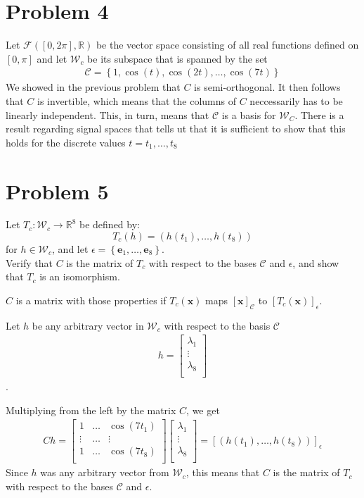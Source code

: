 \documentclass[paper=a4, fontsize=11pt]{scrartcl} %
\numberwithin{equation}{section} %
\numberwithin{figure}{section} %
\numberwithin{table}{section} %
\theoremstyle{definition}
\begin{document}
\section*{Problem 4}
Let $\mathcal{F}([0, 2\pi], \mathbb{R})$ be the vector space consisting of all real functions defined on $\left[ 0, \pi \right]$ and let
$\mathcal{W}_c$ be its subspace that is spanned by the set
\begin{align*}
  \mathcal{C} = \left\{ 1, \cos(t), \cos(2t), \dots, \cos(7t) \right\}
\end{align*}
We showed in the previous problem that $C$ is semi-orthogonal. It then follows that $C$ is invertible, which means that the columns of $C$ neccessarily
has to be linearly independent. This, in turn, means that $\mathcal{C}$ is a basis for $\mathcal{W}_C$.
There is a result regarding signal spaces that tells ut that it is sufficient to show that this holds for the discrete values
$t = t_1, \dots, t_8$

\section*{Problem 5}
Let $T_c : \mathcal{W}_c \rightarrow \mathbb{R}^8$ be defined by:
$$ T_c\left( h \right) = \left( h(t_1),\dots,h(t_8) \right) $$
for $h \in \mathcal{W}_c$, and let $\epsilon = \left\{ \mathbf{e}_1, \dots, \mathbf{e}_8 \right\}$. \\

Verify that $C$ is the matrix of $T_c$ with respect to the bases $\mathcal{C}$ and $\epsilon$, and show that $T_c$ is an isomorphism. 

$C$ is a matrix with those properties if $T_c(\mathbf{x})$ maps $\left[\mathbf{x}\right]_\mathcal{C}$ to $\left[ T_c(\mathbf{x}) \right]_\epsilon$.

Let $h$ be any arbitrary vector in $\mathcal{W}_c$ with respect to the basis $\mathcal{C}$
\begin{align*}
  h = \begin{bmatrix}
    \lambda_1 \\
	\vdots \\
	\lambda_8\\
  \end{bmatrix}
\end{align*}.

Multiplying from the left by the matrix $C$, we get
\begin{align*}
  Ch = \begin{bmatrix}
   1 & \dots & \cos(7t_1)\\
   \vdots & \dots & \vdots \\
   1 & \dots & \cos(7t_8)\\
  \end{bmatrix} \begin{bmatrix}
	\lambda_1\\
	\vdots \\
	\lambda_8\\
  \end{bmatrix} = \left[\left( h(t_1), \dots, h(t_8) \right)\right]_\epsilon
\end{align*}
Since $h$ was any arbitrary vector from $\mathcal{W}_c$, this means that $C$ is the matrix of $T_c$ with respect to the bases $\mathcal{C}$ and $\epsilon$.
\end{document}
